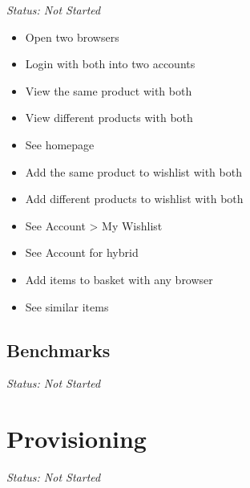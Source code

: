\emph{Status: Not Started}

\begin{itemize}
\item Open two browsers
\item Login with both into two accounts
\item View the same product with both
\item View different products with both
\item See homepage
\item Add the same product to wishlist with both
\item Add different products to wishlist with both
\item See Account > My Wishlist
\item See Account for hybrid
\item Add items to basket with any browser
\item See similar items
\end{itemize}

\subsection{Benchmarks}

\emph{Status: Not Started}

\section{Provisioning}

\emph{Status: Not Started}